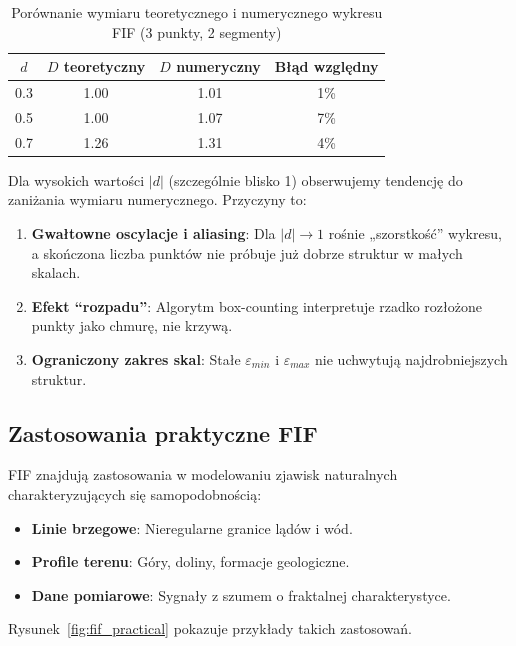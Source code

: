 \documentclass[11pt,a4paper]{article}
\begin{document}
\begin{table}[H]
    \centering
    \caption{Porównanie wymiaru teoretycznego i numerycznego wykresu FIF (3 punkty, 2 segmenty)}
    \begin{tabular}{cccc}
        \toprule
        $d$ & $D$ teoretyczny & $D$ numeryczny & Błąd względny \\
        \midrule
        0.3 & 1.00 & 1.01 & 1\% \\
        0.5 & 1.00 & 1.07 & 7\% \\
        0.7 & 1.26 & 1.31 & 4\% \\
        \bottomrule
    \end{tabular}
    \label{tab:fif_dimensions}
\end{table}

Dla wysokich wartości $|d|$ (szczególnie blisko 1) obserwujemy tendencję do zaniżania wymiaru numerycznego. Przyczyny to:
\begin{enumerate}
    \item \textbf{Gwałtowne oscylacje i aliasing}: Dla $|d| \to 1$ rośnie „szorstkość” wykresu, a skończona liczba punktów nie próbuje już dobrze struktur w małych skalach.
    \item \textbf{Efekt ``rozpadu''}: Algorytm box-counting interpretuje rzadko rozłożone punkty jako chmurę, nie krzywą.
    \item \textbf{Ograniczony zakres skal}: Stałe $\varepsilon_{min}$ i $\varepsilon_{max}$ nie uchwytują najdrobniejszych struktur.
\end{enumerate}

\subsection{Zastosowania praktyczne FIF}

FIF znajdują zastosowania w modelowaniu zjawisk naturalnych charakteryzujących się samopodobnością:

\begin{itemize}
    \item \textbf{Linie brzegowe}: Nieregularne granice lądów i wód.
    \item \textbf{Profile terenu}: Góry, doliny, formacje geologiczne.
    \item \textbf{Dane pomiarowe}: Sygnały z szumem o fraktalnej charakterystyce.
\end{itemize}

Rysunek~\ref{fig:fif_practical} pokazuje przykłady takich zastosowań.
\end{document}
